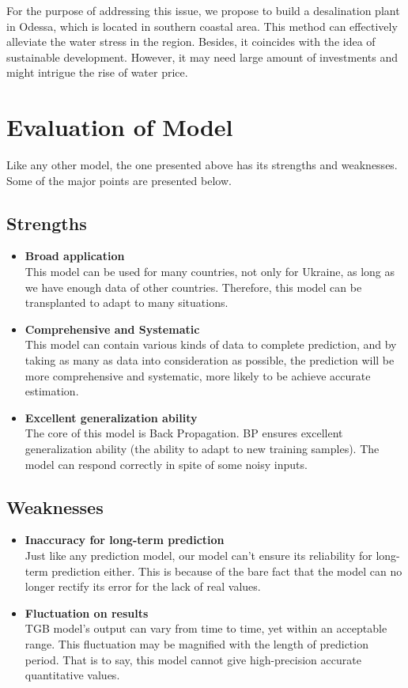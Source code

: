 For the purpose of addressing this issue, we propose to build a desalination plant in Odessa, which is located in southern coastal area. This method can effectively alleviate the water stress in the region. Besides, it coincides with the idea of sustainable development. However, it may need large amount of investments and might intrigue the rise of water price.

\section{Evaluation of Model}
Like any other model, the one presented above has its strengths and weaknesses. Some of the major points are presented below.
\subsection{Strengths}
\begin{itemize}
\item \textbf{Broad application}\\
This model can be used for many countries, not only for Ukraine, as long as we have enough data of other countries. Therefore, this model can be transplanted to adapt to many situations.
\item \textbf{Comprehensive and Systematic}\\
This model can contain various kinds of data to complete prediction, and by taking as many as data into consideration as possible, the prediction will be more comprehensive and systematic, more likely to be achieve accurate estimation.
\item \textbf{Excellent generalization ability}\\
The core of this model is Back Propagation. BP ensures excellent generalization ability (the ability to adapt to new training samples). The model can respond correctly in spite of some noisy inputs.
\end{itemize}
\subsection{Weaknesses}
\begin{itemize}
\item \textbf{Inaccuracy for long-term prediction}\\
Just like any prediction model, our model can't ensure its reliability for long-term prediction either. This is because of the bare fact that the model can no longer rectify its error for the lack of real values.
\item \textbf{Fluctuation on results}\\
TGB model's output can vary from time to time, yet within an acceptable range. This fluctuation may be magnified with the length of prediction period. That is to say, this model cannot give high-precision accurate quantitative values.
\end{itemize}


